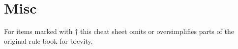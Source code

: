\section*{Misc}


For items marked with $\dagger$ this cheat sheet omits or
oversimplifies parts of the original rule book for brevity.
